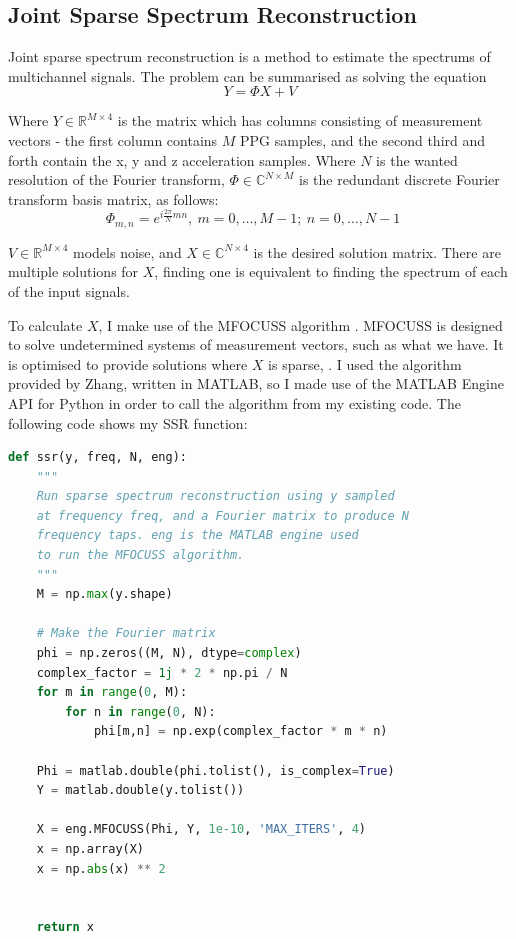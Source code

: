 \documentclass[12pt,a4paper,twoside,openright]{report}
\begin{document}
\subsection{Joint Sparse Spectrum Reconstruction}

Joint sparse spectrum reconstruction is a method to estimate the spectrums of
multichannel signals. The problem can be summarised as solving the equation 
$$ Y = \Phi X + V $$

Where $Y \in \mathbb{R}^{M \times 4}$ is the matrix which has columns consisting of measurement vectors -
the first column contains $M$ PPG samples, and the second third and forth contain
the x, y and z acceleration samples. Where $N$ is the wanted resolution of
the Fourier transform, $\Phi \in \mathbb{C}^{N \times M}$ is the redundant discrete Fourier
transform basis matrix, as follows:
$$ \Phi_{m,n} = e^{i \frac{2 \pi}{N}mn},\ m = 0,\ldots,M-1;\ n=0,\ldots,N-1
\quad $$

$V \in \mathbb{R} ^{M \times 4}$ models noise, and $X \in
\mathbb{C}^{N \times 4}$ is the desired solution matrix. There are multiple
solutions for $X$, finding one is equivalent to finding the spectrum of each
of the input signals.

To calculate $X$, I make use of the MFOCUSS algorithm \cite{Cotter05}.
MFOCUSS is designed to solve undetermined systems of measurement vectors, such
as what we have. It is optimised to provide solutions where $X$ is sparse, .
I used the
algorithm provided by Zhang, written in MATLAB, so I made use of the MATLAB
Engine API for Python in order to call the algorithm from my existing code. The 
following code shows my SSR function:

\begin{lstlisting}[language=Python]
def ssr(y, freq, N, eng):
    """
    Run sparse spectrum reconstruction using y sampled 
    at frequency freq, and a Fourier matrix to produce N 
    frequency taps. eng is the MATLAB engine used
    to run the MFOCUSS algorithm.
    """
    M = np.max(y.shape)

    # Make the Fourier matrix
    phi = np.zeros((M, N), dtype=complex)
    complex_factor = 1j * 2 * np.pi / N 
    for m in range(0, M): 
        for n in range(0, N): 
            phi[m,n] = np.exp(complex_factor * m * n)

    Phi = matlab.double(phi.tolist(), is_complex=True)
    Y = matlab.double(y.tolist())

    X = eng.MFOCUSS(Phi, Y, 1e-10, 'MAX_ITERS', 4)
    x = np.array(X)
    x = np.abs(x) ** 2


    return x
\end{lstlisting}
\end{document}
